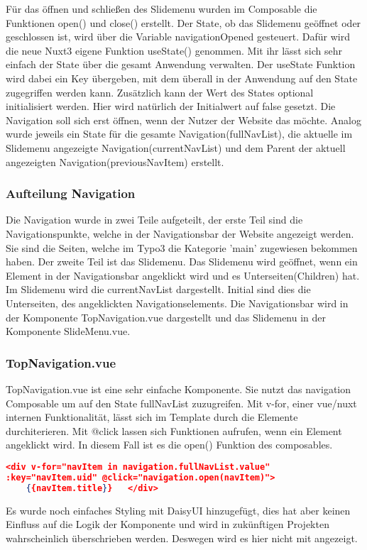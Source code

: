 Für das öffnen und schließen des Slidemenu wurden im Composable die Funktionen open() und close() erstellt. Der State, ob das Slidemenu geöffnet oder geschlossen ist, wird über die Variable navigationOpened gesteuert. Dafür wird die neue Nuxt3 eigene Funktion useState() genommen. Mit ihr lässt sich sehr einfach der State über die gesamt Anwendung verwalten. Der useState Funktion wird dabei ein Key übergeben, mit dem überall in der Anwendung auf den State zugegriffen werden kann. Zusätzlich kann der Wert des States optional initialisiert werden. Hier wird natürlich der Initialwert auf false gesetzt. Die Navigation soll sich erst öffnen, wenn der Nutzer der Website das möchte.
Analog wurde jeweils ein State für die gesamte Navigation(fullNavList), die aktuelle im Slidemenu angezeigte Navigation(currentNavList) und dem Parent der aktuell angezeigten Navigation(previousNavItem) erstellt.

\subsubsection{Aufteilung Navigation}
\label{sec:Aufteilung Navigation}

Die Navigation wurde in zwei Teile aufgeteilt, der erste Teil sind die Navigationspunkte, welche in der Navigationsbar der Website angezeigt werden. Sie sind die Seiten, welche im Typo3 die Kategorie 'main' zugewiesen bekommen haben. Der zweite Teil ist das Slidemenu. Das Slidemenu wird geöffnet, wenn ein Element in der Navigationsbar angeklickt wird und es Unterseiten(Children) hat. Im Slidemenu wird die currentNavList dargestellt. Initial sind dies die Unterseiten, des angeklickten Navigationselements. Die Navigationsbar wird in der Komponente TopNavigation.vue dargestellt und das Slidemenu in der Komponente SlideMenu.vue.

\subsubsection{TopNavigation.vue}
\label{sec:TopNavigation.vue}

TopNavigation.vue ist eine sehr einfache Komponente. Sie nutzt das navigation Composable um auf den State fullNavList zuzugreifen. Mit v-for, einer vue/nuxt internen Funktionalität, lässt sich im Template durch die Elemente durchiterieren. Mit @click lassen sich Funktionen aufrufen, wenn ein Element angeklickt wird. In diesem Fall ist es die open() Funktion des composables.
\begin{lstlisting}[language=json,firstnumber=1]
<div v-for="navItem in navigation.fullNavList.value" 
:key="navItem.uid" @click="navigation.open(navItem)">
	{{navItem.title}}	</div>
\end{lstlisting}
Es wurde noch einfaches Styling mit DaisyUI hinzugefügt, dies hat aber keinen Einfluss auf die Logik der Komponente und wird in zukünftigen Projekten wahrscheinlich überschrieben werden. Deswegen wird es hier nicht mit angezeigt.

